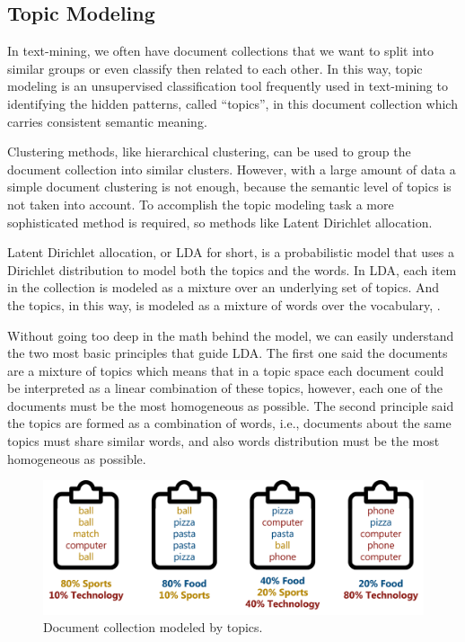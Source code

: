 	\subsection{Topic Modeling}
	
	In text-mining, we often have document collections that we want to split into similar groups or even classify then related to each other. In this way, topic modeling is an unsupervised classification tool frequently used in text-mining to identifying the hidden patterns, called ``topics'', in this document collection which carries consistent semantic meaning.
	
	Clustering methods, like hierarchical clustering, can be used to group the document collection into similar clusters. However, with a large amount of data a simple document clustering is not enough, because the semantic level of topics is not taken into account. To accomplish the topic modeling task a more sophisticated method is required, so methods like Latent Dirichlet allocation.
	
	Latent Dirichlet allocation, or LDA for short, is a probabilistic model that uses a Dirichlet distribution to model both the topics and the words. In LDA, each item in the collection is modeled as a mixture over an underlying set of topics. And the topics, in this way, is modeled as a mixture of words over the vocabulary, \cite{blei2003latent}.
		
	Without going too deep in the math behind the model, we can easily understand the two most basic principles that guide LDA. The first one said the documents are a mixture of topics which means that in a topic space each document could be interpreted as a linear combination of these topics, however, each one of the documents must be the most homogeneous as possible. The second principle said the topics are formed as a combination of words, i.e., documents about the same topics must share similar words, and also words distribution must be the most homogeneous as possible.
	
	\begin{figure}[h!]
		\centering
		\includegraphics[width=0.85\linewidth]{01.Chapters/02.Background/topic_modeling}
		\caption{Document collection modeled by topics.}
		\label{fig:topicmodeling}
	\end{figure}
	
